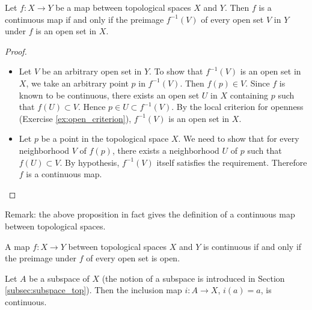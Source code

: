 \begin{proposition}
  Let $f:X\to Y$ be a map between topological spaces $X$ and $Y$. Then $f$
	is a continuous map if and only if the preimage $f^{-1}(V)$ of every open
	set $V$ in $Y$ under $f$ is an open set in $X$.
\end{proposition}

\begin{proof} \quad

	\begin{itemize}
		\item [$\Longrightarrow$] Let $V$ be an arbitrary open set in $Y$. To
		      show that $f^{-1}(V)$ is an open set in $X$, we take an arbitrary
		      point $p$ in $f^{-1}(V)$. Then $f(p)\in V$. Since $f$ is known to
		      be continuous, there exists an open set $U$ in $X$ containing $p$
		      such that $f(U)\subset V$. Hence $p\in U\subset f^{-1}(V)$. By the
		      local criterion for openness (Exercise \ref{ex:open_criterion}),
		      $f^{-1}(V)$ is an open set in $X$.

		\item [$\Longleftarrow$] Let $p$ be a point in the topological space
		      $X$. We need to show that for every neighborhood $V$ of $f(p)$,
		      there exists a neighborhood $U$ of $p$ such that $f(U)\subset V$.
		      By hypothesis, $f^{-1}(V)$ itself satisfies the requirement.
		      Therefore $f$ is a continuous map.
	\end{itemize}

\end{proof}




Remark: the above proposition in fact gives the definition of a continuous map
between topological spaces.




\begin{definition}
	A map $f:X\to Y$ between topological spaces $X$ and $Y$ is continuous if
	and only if the preimage under $f$ of every open set is open.
\end{definition}


\begin{example}
	Let $A$ be a subspace of $X$ (the notion of a subspace is introduced in
	Section \ref{subsec:subspace_top}). Then the inclusion map $i:A\to X$,
	$i(a)=a$, is continuous.
\end{example}


